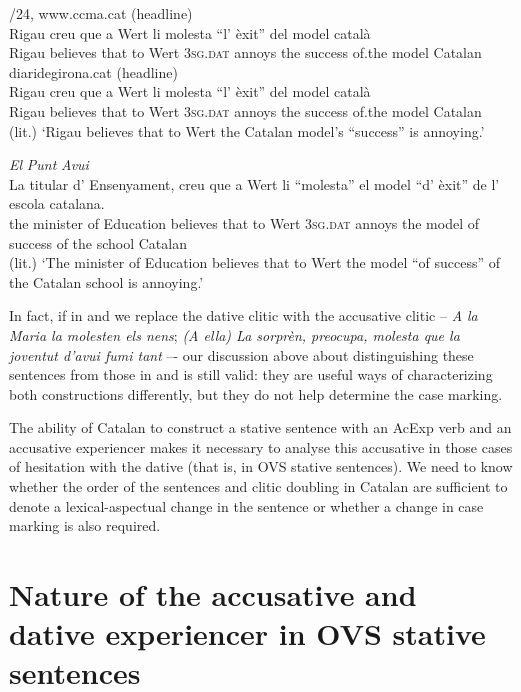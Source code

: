 \documentclass[output=paper,colorlinks,citecolor=brown,modfonts,nonflat]{langsci/langscibook}
\begin{document}
\ea%
 \label{ex:royo:7}
 /24, www.ccma.cat (headline)\\
 \gll Rigau creu que a Wert li molesta “l' èxit” del model català\\
  Rigau believes that to Wert \textsc{3sg.dat} annoys the success of.the model Catalan\\

 \ex diaridegirona.cat (headline)\\
 \gll Rigau creu que a Wert li molesta “l’ èxit” del model català\\
Rigau believes that to Wert \textsc{3sg.dat} annoys   the success of.the model Catalan \\
 \glt (lit.) ‘Rigau believes that to Wert the Catalan model’s “success” is annoying.’

 \ex \emph{El} \emph{Punt} \emph{Avui}\\
 \gll La titular d’ Ensenyament, creu que a Wert li “molesta” el model “d’ èxit” de l’ escola catalana.\\
 the minister of Education believes that to Wert \textsc{3sg.dat} annoys the model of success of the school Catalan\\
 \glt (lit.) ‘The minister of Education believes that to Wert the model “of success” of the Catalan school
is annoying.’
 \z
 \z


In fact, if in  and  we replace the dative clitic with the accusative clitic – \textit{A la Maria la molesten els nens}; \textit{(A ella) La sorprèn, preocupa, molesta que la joventut d’avui fumi tant} –- our discussion above about distinguishing these sentences from those in  and  is still valid: they are useful ways of characterizing both constructions differently, but they do not help determine the case marking.

The ability of Catalan to construct a stative sentence with an AcExp verb and an accusative experiencer makes it necessary to analyse this accusative in those cases of hesitation with the dative (that is, in OVS stative sentences). We need to know whether the order of the sentences and clitic doubling in Catalan are sufficient to denote a lexical-aspectual change in the sentence or whether a change in case marking is also required.


\section{Nature of the accusative and dative experiencer in OVS stative sentences}\label{sec:royo:3}
\end{document}
